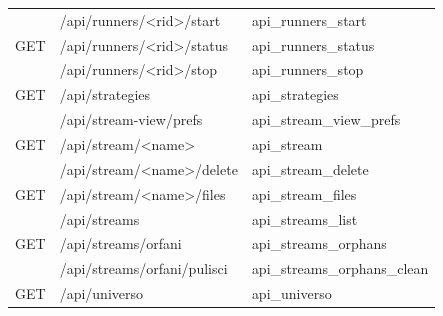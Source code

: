 \begin{longtable}{@{}L{17mm}L{74mm}L{45mm}@{}}
 & {\ttfamily\scriptsize /\allowbreak api/\allowbreak runners/\allowbreak <rid>/\allowbreak start} & {\ttfamily\scriptsize api\_\allowbreak{}runners\_\allowbreak{}start} \\
{\scriptsize\sffamily GET} & {\ttfamily\scriptsize /\allowbreak api/\allowbreak runners/\allowbreak <rid>/\allowbreak status} & {\ttfamily\scriptsize api\_\allowbreak{}runners\_\allowbreak{}status} \\
 & {\ttfamily\scriptsize /\allowbreak api/\allowbreak runners/\allowbreak <rid>/\allowbreak stop} & {\ttfamily\scriptsize api\_\allowbreak{}runners\_\allowbreak{}stop} \\
{\scriptsize\sffamily GET} & {\ttfamily\scriptsize /\allowbreak api/\allowbreak strategies} & {\ttfamily\scriptsize api\_\allowbreak{}strategies} \\
 & {\ttfamily\scriptsize /\allowbreak api/\allowbreak stream-view/\allowbreak prefs} & {\ttfamily\scriptsize api\_\allowbreak{}stream\_\allowbreak{}view\_\allowbreak{}prefs} \\
{\scriptsize\sffamily GET} & {\ttfamily\scriptsize /\allowbreak api/\allowbreak stream/\allowbreak <name>} & {\ttfamily\scriptsize api\_\allowbreak{}stream} \\
 & {\ttfamily\scriptsize /\allowbreak api/\allowbreak stream/\allowbreak <name>/\allowbreak delete} & {\ttfamily\scriptsize api\_\allowbreak{}stream\_\allowbreak{}delete} \\
{\scriptsize\sffamily GET} & {\ttfamily\scriptsize /\allowbreak api/\allowbreak stream/\allowbreak <name>/\allowbreak files} & {\ttfamily\scriptsize api\_\allowbreak{}stream\_\allowbreak{}files} \\
 & {\ttfamily\scriptsize /\allowbreak api/\allowbreak streams} & {\ttfamily\scriptsize api\_\allowbreak{}streams\_\allowbreak{}list} \\
{\scriptsize\sffamily GET} & {\ttfamily\scriptsize /\allowbreak api/\allowbreak streams/\allowbreak orfani} & {\ttfamily\scriptsize api\_\allowbreak{}streams\_\allowbreak{}orphans} \\
 & {\ttfamily\scriptsize /\allowbreak api/\allowbreak streams/\allowbreak orfani/\allowbreak pulisci} & {\ttfamily\scriptsize api\_\allowbreak{}streams\_\allowbreak{}orphans\_\allowbreak{}clean} \\
{\scriptsize\sffamily GET} & {\ttfamily\scriptsize /\allowbreak api/\allowbreak universo} & {\ttfamily\scriptsize api\_\allowbreak{}universo} \\

\end{longtable}
